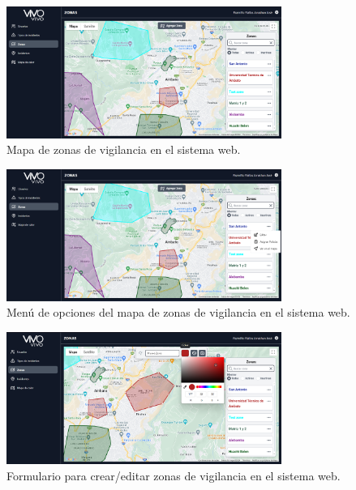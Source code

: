 \begin{figure}[H]
    \centering
    \includegraphics[width=0.8\textwidth]{chapters/III-resultados-y-discusion/resources/images/mapa-zonas-vigilancia-web.png}
    \caption{Mapa de zonas de vigilancia en el sistema web.}
    \label{fig:mapa-zonas-vigilancia-web}
\end{figure}

\begin{figure}[H]
    \centering
    \includegraphics[width=0.8\textwidth]{chapters/III-resultados-y-discusion/resources/images/menu-mapa-zonas-vigilancia-web.png}
    \caption{Menú de opciones del mapa de zonas de vigilancia en el sistema web.}
    \label{fig:menu-mapa-zonas-vigilancia-web}
\end{figure}

\begin{figure}[H]
    \centering
    \includegraphics[width=0.8\textwidth]{chapters/III-resultados-y-discusion/resources/images/formulario-zona-vigilancia-web.png}
    \caption{Formulario para crear/editar zonas de vigilancia en el sistema web.}
    \label{fig:formulario-zona-vigilancia-web}
\end{figure}

